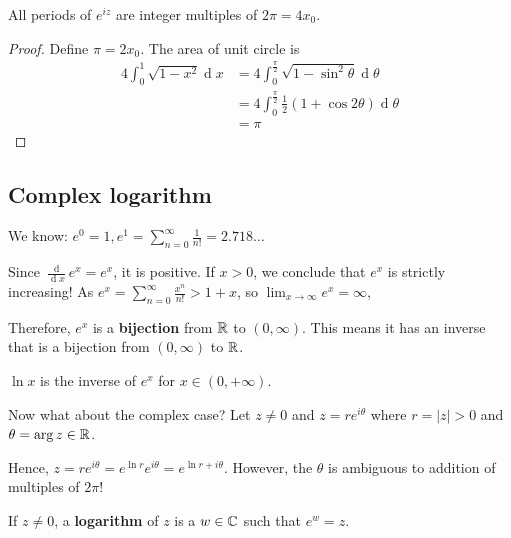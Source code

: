 \documentclass[12pt]{article}
\renewcommand{\d}{\ensuremath{\operatorname{d}}}
\begin{document}
\begin{proposition}
    All periods of $e^{iz}$ are integer multiples of $2\pi=4x_0$.
\end{proposition}

\begin{proof}
    Define $\pi=2x_0$. The area of unit circle is \begin{align*}
        4\int_{0}^{1}\sqrt{1-x^2}\d x &= 4\int_{0}^{\frac{\pi}{2}}\sqrt{1-\sin^2 \theta}\d \theta\\
        &= 4\int_{0}^{\frac{\pi}{2}}\frac{1}{2}(1+\cos 2\theta)\d \theta\\
        &= \pi
    \end{align*}
\end{proof}

\subsection{Complex logarithm}
We know: $e^0=1,e^1=\sum_{n=0}^{\infty}\frac{1}{n!}=2.718\dots$

Since $\frac{\d}{\d x}e^x=e^x$, it is positive. If $x>0$, we conclude that $e^x$ is strictly increasing! As $e^x=\sum_{n=0}^{\infty}\frac{x^n}{n!}>1+x$, so $\lim_{x\to \infty}e^x=\infty$,

Therefore, $e^x$ is a \textbf{bijection} from $\mathbb{R}$ to $(0,\infty)$. This means it has an inverse that is a bijection from $(0,\infty)$ to $\mathbb{R}$.

 $\ln x$ is the inverse of $e^x$ for $x\in (0,+\infty)$.

Now what about the complex case? Let $z\neq 0$ and $z=re^{i\theta}$ where $r=|z|>0$ and $\theta=\arg z\in \mathbb{R}$.

Hence, $z=re^{i\theta}=e^{\ln r}e^{i\theta}=e^{\ln r+i\theta}$. However, the $\theta$ is ambiguous to addition of multiples of $2\pi$!

 If $z\neq 0$, a \textbf{logarithm} of $z$ is a $w\in \mathbb{C}$ such that $e^{w}=z$.
\end{document}
